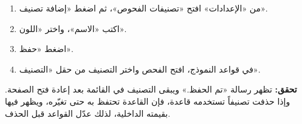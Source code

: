 \begin{enumerate}
\item من «الإعدادات» افتح «تصنيفات الفحوص»، ثم اضغط «إضافة تصنيف».
\item اكتب «الاسم»، واختر «اللون».
\item اضغط «حفظ».
\item في قواعد النموذج، افتح الفحص واختر التصنيف من حقل «التصنيف».
\end{enumerate}

\textbf{تحقق:} تظهر رسالة «تم الحفظ.» ويبقى التصنيف في القائمة بعد إعادة فتح الصفحة. وإذا حذفت تصنيفاً تستخدمه قاعدة، فإن القاعدة تحتفظ به حتى تغيّره، ويظهر فيها بقيمته الداخلية، لذلك عدّل القواعد قبل الحذف.
